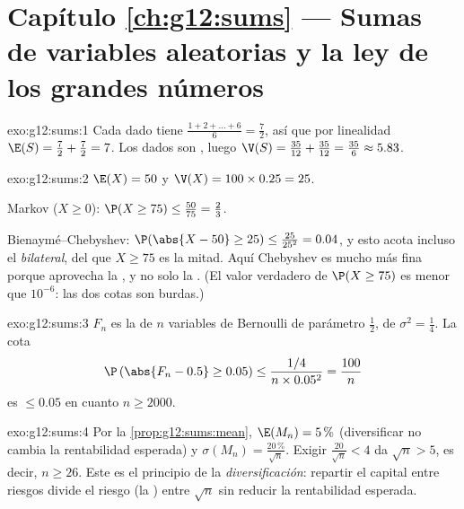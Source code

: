 \section*{Capítulo \ref{ch:g12:sums} --- Sumas de variables aleatorias y la ley de los grandes números}

\begin{solution}{exo:g12:sums:1}
Cada dado tiene  $\frac{1 + 2 + \dots + 6}{6} = \frac{7}{2}$, así
que por linealidad $\E(S) = \frac72 + \frac72 = 7$. Los dados son
, luego
$\V(S) = \frac{35}{12} + \frac{35}{12} = \frac{35}{6} \approx 5.83$.
\end{solution}

\begin{solution}{exo:g12:sums:2}
$\E(X) = 50$ y $\V(X) = 100 \times 0.25 = 25$.

Markov ($X \geq 0$): $\P(X \geq 75) \leq \frac{50}{75} = \frac23$.

Bienaymé--Chebyshev:
$\P(\abs{X - 50} \geq 25) \leq \frac{25}{25^2} = 0.04$, y esto acota
incluso el  \emph{bilateral}, del que $X \geq 75$ es la mitad. Aquí
Chebyshev es mucho más fina porque aprovecha la , y no solo la
. (El valor verdadero de $\P(X \geq 75)$ es menor que $10^{-6}$: las
dos cotas son burdas.)
\end{solution}

\begin{solution}{exo:g12:sums:3}
$F_n$ es la  de $n$ variables de Bernoulli de parámetro
$\frac12$, de  $\sigma^2 = \frac14$. La cota
\[
\P\left(\abs{F_n - 0.5} \geq 0.05\right)
\leq \frac{1/4}{n \times 0.05^2} = \frac{100}{n}
\]
es $\leq 0.05$ en cuanto $n \geq 2000$.
\end{solution}

\begin{solution}{exo:g12:sums:4}
Por la \cref{prop:g12:sums:mean}, $\E(M_n) = 5\,\%$ (diversificar no cambia
la rentabilidad esperada) y $\sigma(M_n) = \frac{20\,\%}{\sqrt n}$. Exigir
$\frac{20}{\sqrt n} < 4$ da $\sqrt n > 5$, es decir, $n \geq 26$. Este es
el principio de la \emph{diversificación}: repartir el capital entre
riesgos  divide el riesgo (la ) entre
$\sqrt n$ sin reducir la rentabilidad esperada.
\end{solution}

